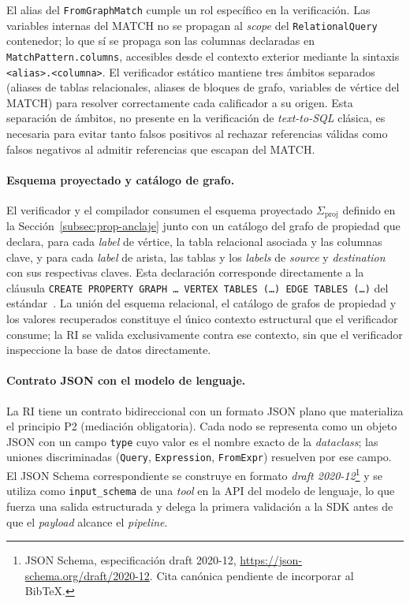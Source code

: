 El alias del \texttt{FromGraphMatch} cumple un rol específico en la verificación. Las variables internas del MATCH no se propagan al \emph{scope} del \texttt{RelationalQuery} contenedor; lo que sí se propaga son las columnas declaradas en \texttt{MatchPattern.columns}, accesibles desde el contexto exterior mediante la sintaxis \texttt{<alias>.<columna>}. El verificador estático mantiene tres ámbitos separados (aliases de tablas relacionales, aliases de bloques de grafo, variables de vértice del MATCH) para resolver correctamente cada calificador a su origen. Esta separación de ámbitos, no presente en la verificación de \emph{text-to-SQL} clásica, es necesaria para evitar tanto falsos positivos al rechazar referencias válidas como falsos negativos al admitir referencias que escapan del MATCH.

\paragraph{Esquema proyectado y catálogo de grafo.} El verificador y el compilador consumen el esquema proyectado $\Sigma_{\mathrm{proj}}$ definido en la Sección~\ref{subsec:prop-anclaje} junto con un catálogo del grafo de propiedad que declara, para cada \emph{label} de vértice, la tabla relacional asociada y las columnas clave, y para cada \emph{label} de arista, las tablas y los \emph{labels} de \emph{source} y \emph{destination} con sus respectivas claves. Esta declaración corresponde directamente a la cláusula \texttt{CREATE PROPERTY GRAPH \ldots\ VERTEX TABLES (\ldots) EDGE TABLES (\ldots)} del estándar~\cite{ISO9075_16_2023, DuckPGQ}. La unión del esquema relacional, el catálogo de grafos de propiedad y los valores recuperados constituye el único contexto estructural que el verificador consume; la \ac{RI} se valida exclusivamente contra ese contexto, sin que el verificador inspeccione la base de datos directamente. %

\paragraph{Contrato JSON con el modelo de lenguaje.} La \ac{RI} tiene un contrato bidireccional con un formato JSON plano que materializa el principio P2 (mediación obligatoria). Cada nodo se representa como un objeto JSON con un campo \texttt{type} cuyo valor es el nombre exacto de la \emph{dataclass}; las uniones discriminadas (\texttt{Query}, \texttt{Expression}, \texttt{FromExpr}) resuelven por ese campo. El JSON Schema correspondiente se construye en formato \emph{draft 2020-12}\footnote{JSON Schema, especificación draft 2020-12, \url{https://json-schema.org/draft/2020-12}. Cita canónica pendiente de incorporar al BibTeX.} y se utiliza como \texttt{input\_schema} de una \emph{tool} en la \ac{API} del modelo de lenguaje, lo que fuerza una salida estructurada y delega la primera validación a la \ac{SDK} antes de que el \emph{payload} alcance el \emph{pipeline}. %

